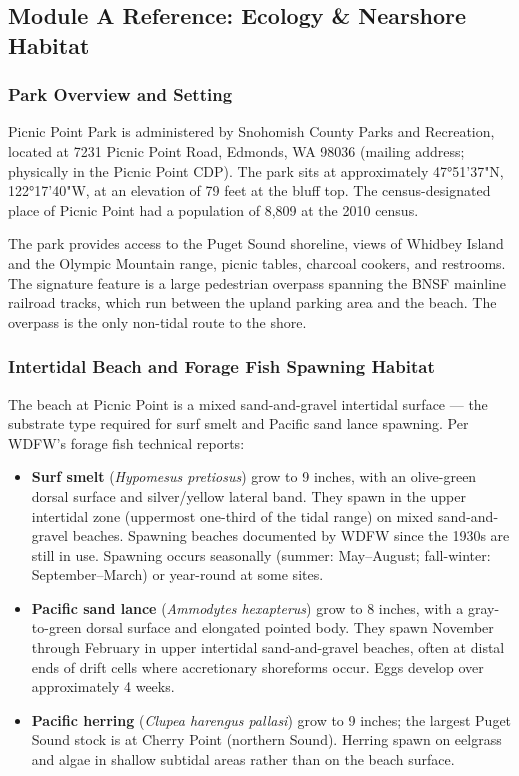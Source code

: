\documentclass[11pt,letterpaper]{article}
\begin{document}
\subsection{Module A Reference: Ecology \& Nearshore Habitat}

\subsubsection{Park Overview and Setting}

Picnic Point Park is administered by Snohomish County Parks and Recreation, located at 7231 Picnic Point Road, Edmonds, WA 98036 (mailing address; physically in the Picnic Point CDP). The park sits at approximately 47°51'37"N, 122°17'40"W, at an elevation of 79 feet at the bluff top. The census-designated place of Picnic Point had a population of 8,809 at the 2010 census.

The park provides access to the Puget Sound shoreline, views of Whidbey Island and the Olympic Mountain range, picnic tables, charcoal cookers, and restrooms. The signature feature is a large pedestrian overpass spanning the BNSF mainline railroad tracks, which run between the upland parking area and the beach. The overpass is the only non-tidal route to the shore.

\subsubsection{Intertidal Beach and Forage Fish Spawning Habitat}

The beach at Picnic Point is a mixed sand-and-gravel intertidal surface --- the substrate type required for surf smelt and Pacific sand lance spawning. Per WDFW's forage fish technical reports:

\begin{itemize}
  \item \textbf{Surf smelt} (\textit{Hypomesus pretiosus}) grow to 9 inches, with an olive-green dorsal surface and silver/yellow lateral band. They spawn in the upper intertidal zone (uppermost one-third of the tidal range) on mixed sand-and-gravel beaches. Spawning beaches documented by WDFW since the 1930s are still in use. Spawning occurs seasonally (summer: May--August; fall-winter: September--March) or year-round at some sites.
  \item \textbf{Pacific sand lance} (\textit{Ammodytes hexapterus}) grow to 8 inches, with a gray-to-green dorsal surface and elongated pointed body. They spawn November through February in upper intertidal sand-and-gravel beaches, often at distal ends of drift cells where accretionary shoreforms occur. Eggs develop over approximately 4 weeks.
  \item \textbf{Pacific herring} (\textit{Clupea harengus pallasi}) grow to 9 inches; the largest Puget Sound stock is at Cherry Point (northern Sound). Herring spawn on eelgrass and algae in shallow subtidal areas rather than on the beach surface.
\end{itemize}
\end{document}
